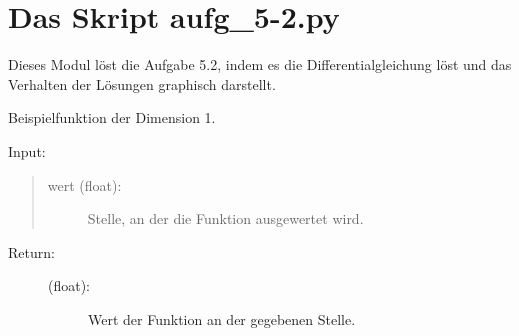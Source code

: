 \documentclass[letterpaper,10pt,ngerman, oneside, openright]{sphinxmanual}
\begin{document}
\chapter{Das Skript aufg\_5-2.py}
\label{\detokenize{index:module-aufg_5_2}}\label{\detokenize{index:das-skript-aufg-5-2-py}}
Dieses Modul löst die Aufgabe 5.2, indem es die Differentialgleichung löst und
das Verhalten der Lösungen graphisch darstellt.

\begin{fulllineitems}
\label{\detokenize{index:aufg_5_2.fntn1}}
Beispielfunktion der Dimension 1.
\begin{description}
\item [{Input:}]
\end{description}
\begin{quote}
\begin{description}
\item[{wert (float):}] \leavevmode
Stelle, an  der die Funktion ausgewertet wird.

\end{description}
\end{quote}
\begin{description}
\item[{Return:}] \leavevmode\begin{description}
\item[{(float):}] \leavevmode
Wert der Funktion an der gegebenen Stelle.

\end{description}

\end{description}

\end{fulllineitems}

\end{document}
